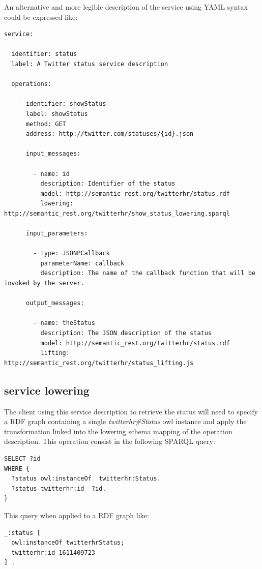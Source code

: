 An alternative and more legible description of the service using YAML syntax could be expressed like:
\vspace{5 mm}
\begin{lstlisting}
service:

  identifier: status
  label: A Twitter status service description

  operations:

    - identifier: showStatus
      label: showStatus
      method: GET
      address: http://twitter.com/statuses/{id}.json

      input_messages:

        - name: id
          description: Identifier of the status
          model: http://semantic_rest.org/twitterhr/status.rdf
          lowering: http://semantic_rest.org/twitterhr/show_status_lowering.sparql

      input_parameters:

        - type: JSONPCallback
          parameterName: callback
          description: The name of the callback function that will be invoked by the server.

      output_messages:

        - name: theStatus
          description: The JSON description of the status
          model: http://semantic_rest.org/twitterhr/status.rdf
          lifting: http://semantic_rest.org/twitterhr/status_lifting.js
\end{lstlisting} \vspace{5 mm}

\subsection{service lowering}

The client using this service description to retrieve the status will need to specify a RDF graph containing a single \emph{twitterhr\#Status} owl instance and apply the transformation linked into the lowering schema mapping of the operation description. This operation consist in the following SPARQL query:
\vspace{5 mm}
\begin{lstlisting}
SELECT ?id 
WHERE {
  ?status owl:instanceOf  twitterhr:Status.
  ?status twitterhr:id  ?id.
}
\end{lstlisting} \vspace{5 mm}

This query when applied to a RDF graph like:
\vspace{5 mm}
\begin{lstlisting}
_:status [
  owl:instanceOf twitterhrStatus;
  twitterhr:id 1611409723
] .
\end{lstlisting} \vspace{5 mm}

